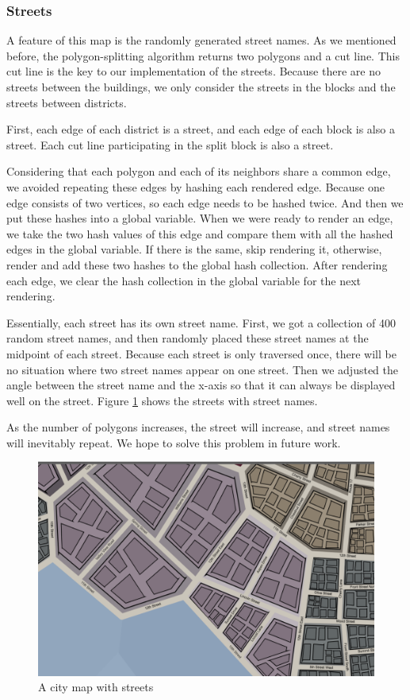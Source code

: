 \subsubsection{Streets}
A feature of this map is the randomly generated street names. As we mentioned before, the polygon-splitting algorithm returns two polygons and a cut line. This cut line is the key to our implementation of the streets. Because there are no streets between the buildings, we only consider the streets in the blocks and the streets between districts.

First, each edge of each district is a street, and each edge of each block is also a street. Each cut line participating in the split block is also a street.

Considering that each polygon and each of its neighbors share a common edge, we avoided repeating these edges by hashing each rendered edge. Because one edge consists of two vertices, so each edge needs to be hashed twice. And then we put these hashes into a global variable. When we were ready to render an edge, we take the two hash values of this edge and compare them with all the hashed edges in the global variable. If there is the same, skip rendering it, otherwise, render and add these two hashes to the global hash collection. After rendering each edge, we clear the hash collection in the global variable for the next rendering.

Essentially, each street has its own street name. First, we got a collection of 400 random street names, and then randomly placed these street names at the midpoint of each street. Because each street is only traversed once, there will be no situation where two street names appear on one street. Then we adjusted the angle between the street name and the x-axis so that it can always be displayed well on the street. Figure \ref{fig:streets} shows the streets with street names.

As the number of polygons increases, the street will increase, and street names will inevitably repeat. We hope to solve this problem in future work.

\begin{figure}[htbp]
  \includegraphics[width=\textwidth]{section04/assets/Map-streets.png}
  \caption{A city map with streets}
  \label{fig:streets}
\end{figure}
